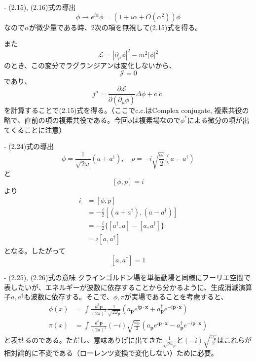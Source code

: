 \documentclass[a4paper]{ltjsarticle}
\begin{document}
- (2.15), (2.16)式の導出
\[
  \phi \to e^{i\alpha} \phi = (1 + i\alpha + O(\alpha^2)) \phi
\]
なので$\alpha$が微少量である時、2次の項を無視して(2.15)式を得る。

また
\[
\mathcal{L} = |\partial_\mu \phi|^2 - m^2 |\phi|^2
\]
のとき、この変分でラグランジアンは変化しないから、
\[
  \mathcal{J} = 0
\]
であり、
\[
  j^\mu = \frac{\partial \mathcal{L}}{\partial(\partial_\mu \phi)} \Delta \phi + \text{c.c.}
\]
を計算することで(2.15)式を得る。（ここでc.c.はComplex conjugate, 複素共役の略で、直前の項の複素共役である。今回$\phi$は複素場なので$\phi^*$による微分の項が出てくることに注意）

- (2.24)式の導出
\[
  \phi = \frac{1}{\sqrt{2\omega}} (a + a^\dagger), \quad p = -i \sqrt{\frac{\omega}{2}}(a - a^\dagger)
\]
と
\[
  [\phi, p] = i
\]
より
\begin{align*}
  i & = [\phi, p] \\
    & = - \frac{i}{2}  [(a + a^\dagger), (a - a^\dagger)] \\
    & = -\frac{i}{2} \{[a^\dagger, a] - [a, a^\dagger]\} \\
    & = i [a, a^\dagger]
\end{align*}
となる。したがって
\[
[a, a^\dagger] = 1
\]

- (2.25), (2.26)式の意味
クラインゴルドン場を単振動場と同様にフーリエ空間で表したいが、エネルギーが波数に依存することから分かるように、生成消滅演算子$a, a^\dagger$も波数に依存する。そこで、$\phi, \pi$が実場であることを考慮すると、
\begin{align*}
  \phi(x) & = \int \frac{d^3\bm{p}}{(2\pi)^3} \frac{1}{\sqrt{2\omega_{\bm{p}}}} ( a_{\bm{p}} e^{i \bm{p} \cdot \bm{x}} + a_{\bm{p}}^\dagger e^{-i \bm{p} \cdot \bm{x}}) \\
  \pi(x)  & = \int \frac{d^3\bm{p}}{(2\pi)^3} (-i) \sqrt{\frac{\omega_{\bm{p}}}{2}} ( a_{\bm{p}} e^{i \bm{p} \cdot \bm{x}} - a_{\bm{p}}^\dagger e^{-i \bm{p} \cdot \bm{x}})
\end{align*}
と表せるのである。ただし、意味ありげに出てきた$\frac{1}{\sqrt{2\omega_{\bm{p}}}}$と$(-i)\sqrt{\frac{\omega_{\bm{p}}}{2}}$はこれらが相対論的に不変である（ローレンツ変換で変化しない）ために必要。
\end{document}
